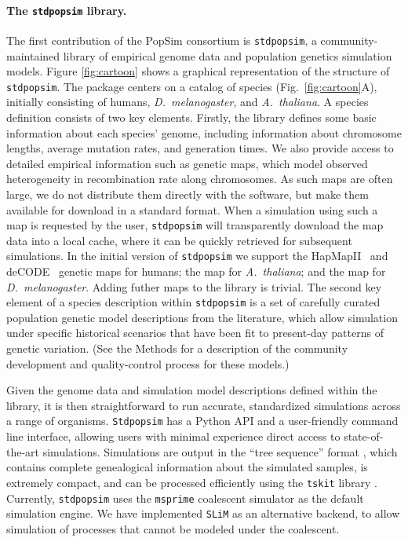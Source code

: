 \documentclass[12pt,halfline,a4paper]{ouparticle}
\newcommand{\Stdpopsim}{\texttt{Stdpopsim}\xspace}
\newcommand{\stdpopsim}{\texttt{stdpopsim}\xspace}
\newcommand{\tskit}{\texttt{tskit}\xspace}
\begin{document}
\paragraph{The \stdpopsim library.}
The first contribution of the PopSim consortium is \stdpopsim, a
community-maintained library of empirical genome data and population genetics simulation
models. Figure \ref{fig:cartoon} shows a graphical
representation of the structure of \stdpopsim. The package centers
on a catalog of species (Fig.~\ref{fig:cartoon}A), initially consisting of humans,
\textit{D.~melanogaster}, and \textit{A.~thaliana}.
A species definition consists of two key elements.  Firstly, the library defines
some basic information about each species' genome, including information about chromosome
lengths, average mutation rates, and generation times. We also provide access to detailed
empirical information such as genetic maps, which model observed
heterogeneity in recombination rate along chromosomes. As such maps are often large,
we do not distribute them directly with the software, but make them available
for download in a standard format. When a simulation using such a map is
requested by the user, \stdpopsim will transparently download the map
data into a local cache,
where it can be quickly retrieved for subsequent simulations.
In the initial version of \stdpopsim we support
the HapMapII~\citep{international2007second} and
deCODE~\citep{kong2010fine} genetic maps for humans;
the \cite{salome2011recombination} map for \emph{A.~thaliana};
and the \cite{comeron2012many} map for \emph{D.~melanogaster}.
Adding futher maps to the library is trivial.
The second key element of a species description
within \stdpopsim is a set of carefully curated population genetic model
descriptions from the literature, which allow simulation under
specific historical scenarios that have been fit to present-day patterns of
genetic variation. (See the Methods for a description of the community
development and quality-control process for these models.)

Given the genome data and simulation model descriptions defined within the
library, it is then straightforward to run accurate, standardized simulations
across a range of organisms. \Stdpopsim has a Python API and a user-friendly
command line interface, allowing users with minimal experience direct access to
state-of-the-art simulations. Simulations are output in the ``tree sequence''
format \citep{kelleher2016efficient,kelleher2018efficient,kelleher2019inferring}, which
contains complete genealogical information about the simulated samples, is
extremely compact, and can be processed efficiently using the \tskit library
\citep{kelleher2016efficient,kelleher2018efficient}. Currently,
\stdpopsim uses the  \texttt{msprime} coalescent simulator \citep{kelleher2016efficient}
as the default simulation engine.
We have implemented \texttt{SLiM} \citep{haller2019tree,haller2019slim} 
as an alternative backend,
to allow simulation of processes that cannot be modeled under the coalescent.
\end{document}

